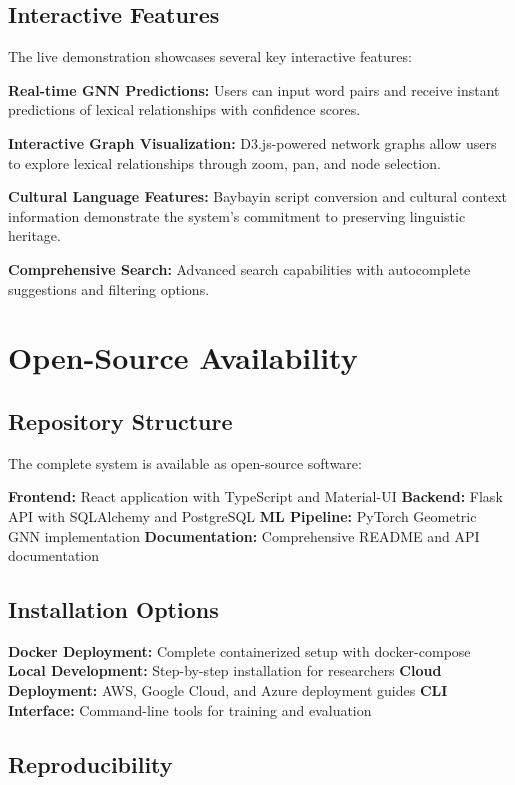 \documentclass[11pt]{article}
\begin{document}
\subsection{Interactive Features}

The live demonstration showcases several key interactive features:

\textbf{Real-time GNN Predictions:} Users can input word pairs and receive instant predictions of lexical relationships with confidence scores.

\textbf{Interactive Graph Visualization:} D3.js-powered network graphs allow users to explore lexical relationships through zoom, pan, and node selection.

\textbf{Cultural Language Features:} Baybayin script conversion and cultural context information demonstrate the system's commitment to preserving linguistic heritage.

\textbf{Comprehensive Search:} Advanced search capabilities with autocomplete suggestions and filtering options.

\section{Open-Source Availability}

\subsection{Repository Structure}

The complete system is available as open-source software:

\textbf{Frontend:} React application with TypeScript and Material-UI
\textbf{Backend:} Flask API with SQLAlchemy and PostgreSQL
\textbf{ML Pipeline:} PyTorch Geometric GNN implementation
\textbf{Documentation:} Comprehensive README and API documentation

\subsection{Installation Options}

\textbf{Docker Deployment:} Complete containerized setup with docker-compose
\textbf{Local Development:} Step-by-step installation for researchers
\textbf{Cloud Deployment:} AWS, Google Cloud, and Azure deployment guides
\textbf{CLI Interface:} Command-line tools for training and evaluation

\subsection{Reproducibility}
\end{document}
